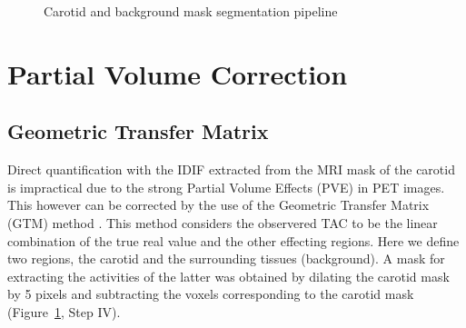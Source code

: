 \begin{figure}[h]
	\centering
	\caption{Carotid and background mask segmentation pipeline}
	\label{fig:seg_pipeline}
\end{figure}

\section{Partial Volume Correction}
\subsection{Geometric Transfer Matrix}
Direct quantification with the IDIF extracted from the MRI mask of the carotid is impractical due to the strong Partial Volume Effects (PVE) in PET images. %
This however can be corrected by the use of the Geometric Transfer Matrix (GTM) method \cite{rousset1998correction}.
This method considers the observered TAC to be the linear combination of the true real value and the other effecting regions.
Here we define two regions, the carotid and the surrounding tissues (background).
A mask for extracting the activities of the latter was obtained by dilating the carotid mask by 5 pixels and subtracting the voxels corresponding to the carotid mask (Figure~\ref{fig:seg_pipeline}, Step IV).


